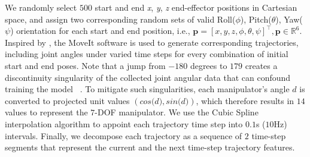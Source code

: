 We randomly select $500$ start and end \textit{x}, \textit{y}, \textit{z} end-effector positions in Cartesian space, and assign two corresponding random sets of valid Roll($\phi$), Pitch($\theta$), Yaw($\psi$) orientation for each start and end position, i.e.,  $\mathbf{p} = [\textit{x}, \textit{y}, \textit{z}, \phi, \theta,\psi]^\top, \mathbf{p} \in \mathbb{R}^{6}$. Inspired by \cite{hamalainen_affordance_2019}, the MoveIt software is used to generate corresponding trajectories, including joint angles under varied time steps for every combination of initial start and end poses. Note that a jump from $-180$ degrees to $179$ creates a discontinuity singularity of the collected joint angular data that can confound training the model ~\cite{weigend_anytime_2023}. 
To mitigate such singularities, each manipulator's angle $\mathbf{\textit{d}}$ is converted to projected unit values $\mathbf{(\textit{cos(d)}, \textit{sin(d)})}$, which therefore results in $14$ values to represent the $7$-DOF manipulator. We use the Cubic Spline interpolation algorithm to appoint each trajectory time step into $0.1$s ($10$Hz) intervals. Finally, we decompose each trajectory as a sequence of $2$ time-step segments that represent the current and the next time-step trajectory features.

